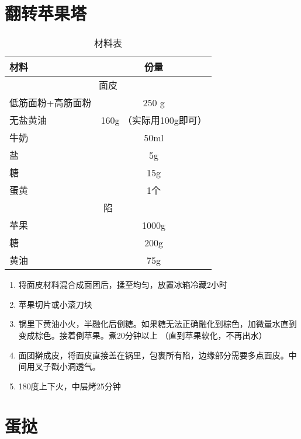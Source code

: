 \section{翻转苹果塔}

\begin{table}[h]
    \centering
    \begin{tabular}{|l||c|}\hline
     \textbf{材料}    &  \textbf{份量}\\ \hline\hline
    \multicolumn{2}{|c|}{面皮}\\ \hline
    低筋面粉+高筋面粉     &  250 g \\ \hline
    无盐黄油     &  160g （实际用100g即可）\\ \hline
    牛奶  & 50ml  \\ \hline
    盐 &  5g  \\ \hline
    糖     &  15g \\ \hline
    蛋黄     & 1个  \\ \hline
    \multicolumn{2}{|c|}{陷}\\ \hline
    苹果     &  1000g \\ \hline
    糖     &  200g \\ \hline
    黄油     &  75g \\ \hline
    \end{tabular}
    \caption{材料表}
\end{table}

\begin{enumerate}
    \item 将面皮材料混合成面团后，揉至均匀，放置冰箱冷藏2小时
    \item 苹果切片或小滚刀块
    \item 锅里下黄油小火，半融化后倒糖。如果糖无法正确融化到棕色，加微量水直到变成棕色。接着倒苹果。煮20分钟以上 （直到苹果软化，不再出水）
    \item 面团擀成皮，将面皮直接盖在锅里，包裹所有陷，边缘部分需要多点面皮。中间用叉子戳小洞透气。
    \item 180度上下火，中层烤25分钟
\end{enumerate}

\section{蛋挞}

